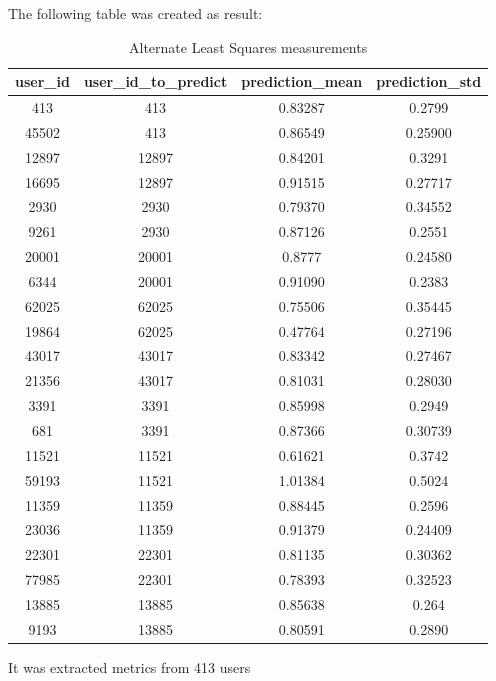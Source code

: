 \documentclass[ecp,tc,english]{iiufrgs}
\begin{document}
        The following table was created as result:
        \begin{table}[!ht]
            \centering
            \begin{tabular}{ |c|c|c|c| } 
                \hline
                user\_id & user\_id\_to\_predict & prediction\_mean & prediction\_std \\
                \hline 
                413 & 413 & 0.83287 & 0.2799 \\
                45502 & 413 & 0.86549 & 0.25900 \\
                \rowcolor[RGB]{220,220,220}
                12897 & 12897 & 0.84201 & 0.3291 \\
                \rowcolor[RGB]{220,220,220}        
                16695 & 12897 & 0.91515 & 0.27717 \\
                2930 & 2930 & 0.79370 & 0.34552 \\
                9261 & 2930 & 0.87126 & 0.2551 \\
                \rowcolor[RGB]{220,220,220}        
                20001 & 20001 & 0.8777 & 0.24580 \\
                \rowcolor[RGB]{220,220,220}        
                6344 & 20001 & 0.91090 & 0.2383 \\
                62025 & 62025 & 0.75506 & 0.35445 \\
                19864 & 62025 & 0.47764 & 0.27196 \\
                \rowcolor[RGB]{220,220,220}        
                43017 & 43017 & 0.83342 & 0.27467 \\
                \rowcolor[RGB]{220,220,220}        
                21356 & 43017 & 0.81031 & 0.28030 \\
                3391 & 3391 & 0.85998 & 0.2949 \\
                681 & 3391 & 0.87366 & 0.30739 \\
                \rowcolor[RGB]{220,220,220}        
                11521 & 11521 & 0.61621 & 0.3742 \\
                \rowcolor[RGB]{220,220,220}                
                59193 & 11521 & 1.01384 & 0.5024 \\
                11359 & 11359 & 0.88445 & 0.2596 \\
                23036 & 11359 & 0.91379 & 0.24409 \\
                \rowcolor[RGB]{220,220,220}                
                22301 & 22301 & 0.81135 & 0.30362 \\
                \rowcolor[RGB]{220,220,220}                
                77985 & 22301 & 0.78393 & 0.32523 \\
                13885 & 13885 & 0.85638 & 0.264 \\
                9193 & 13885 & 0.80591 & 0.2890 \\
                \hline
            \end{tabular}
            \caption{Alternate Least Squares measurements}
            \label{tab:my_label}
        \end{table}
        It was extracted metrics from 413 users
\end{document}

